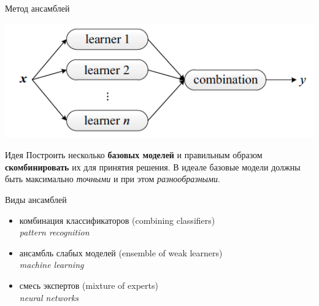 \documentclass[10pt,a4paper]{beamer}
\begin{document}

\begin{frame}{Метод ансамблей}

\begin{center}
\includegraphics[scale=0.5]{images/ensemble.png}
\end{center}

\begin{block}{Идея}
Построить несколько {\bf базовых моделей} и правильным образом {\bf скомбинировать} их для принятия решения. В идеале базовые модели должны быть максимально {\it точными} и при этом {\it разнообразными}.
\end{block}

\end{frame}


\begin{frame}{Виды ансамблей}

\begin{itemize}
\item комбинация классификаторов (combining classifiers) \\
{\it pattern recognition}
\item ансамбль слабых моделей (ensemble of weak learners) \\
{\it machine learning}
\item смесь экспертов (mixture of experts) \\
{\it neural networks}
\end{itemize}

\end{frame}

\end{document}
